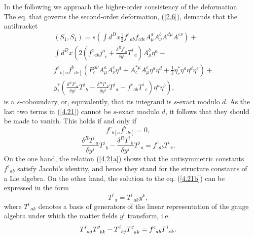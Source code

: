 \documentclass[a4paper,12pt]{article}
\begin{document}
In the following we approach the
higher-order consistency of the
deformation. The eq. that governs the
second-order deformation, (\ref{2.6}),
demands that the antibracket
\begin{eqnarray}
&&\left( S_{1},S_{1}\right) =
s\left( \int d^{D}x\frac{1}{2}f_{\;%
\;ab}^{c}f_{cde}A_{\mu }^{a}
A_{\nu }^{b}A^{d\mu }A^{e\nu }\right) +
\nonumber \\
&&\int d^{D}x\left( 2\left(
f_{\;\;ab}^{c}j_{\;\;c}^{\mu }+\frac{\delta
^{R}j_{\;\;b}^{\mu }}{\delta y^{i}}
T_{\;\;a}^{i}\right) A_{\mu }^{b}\eta
^{a}-\right. \nonumber \\
& &f_{\;\;b\left[ a\right. }^{c}
f_{\;\;\left. de\right] }^{b}\left( F_{c}^{\mu
\nu }A_{\mu }^{a}A_{\nu }^{e}
\eta ^{d}+A_{c}^{*\mu }A_{\mu }^{e}\eta
^{a}\eta ^{d}+\frac{1}{3}
\eta _{c}^{*}\eta ^{a}\eta ^{d}\eta ^{e}\right) +
\nonumber \\
&&\left. y_{i}^{*}\left( \frac{\delta ^{R}
T_{\;\;a}^{i}}{\delta y^{j}}%
T_{\;\;b}^{j}-\frac{\delta ^{R}
T_{\;\;b}^{i}}{\delta y^{j}}%
T_{\;\;a}^{j}-f_{\;\;ab}^{c}T_{\;\;c}^{i}\right) 
\eta ^{a}\eta ^{b}\right) ,
\label{4.21}
\end{eqnarray}
is a $s$-coboundary, or, equivalently,
that its integrand is $s$-exact
modulo $d$. As the last two terms in
(\ref{4.21}) cannot be $s$-exact modulo
$d$, it follows that they should be made
to vanish. This holds if and only
if
\begin{equation}
f_{\;\;b\left[ a\right. }^{c}
f_{\;\;\left. de\right] }^{b}=0,  \label{4.21a}
\end{equation}
\begin{equation}
\frac{\delta ^{R}T_{\;\;a}^{i}}{\delta y^{j}}
T_{\;\;b}^{j}-\frac{\delta
^{R}T_{\;\;b}^{i}}{\delta y^{j}}T_{\;\;a}^{j}=
f_{\;\;ab}^{c}T_{\;\;c}^{i}.
\label{4.21b}
\end{equation}
On the one hand, the relation (\ref{4.21a})
shows that the antisymmetric
constants $f_{\;\;ab}^{c}$ satisfy Jacobi's
identity, and hence they stand
for the structure constants of a Lie algebra.
On the other hand, the
solution to the eq. (\ref{4.21b}) can
be expressed in the form
\begin{equation}
T_{\;\;a}^{i}=T_{\;\;ak}^{i}y^{k},  \label{4.21c}
\end{equation}
where $T_{\;\;ak}^{i}$ denotes a basis
of generators of the linear
representation of the gauge algebra
under which the matter fields $y^{i}$
transform, i.e.
\begin{equation}
T_{\;\;aj}^{i}T_{\;\;bk}^{j}-T_{\;\;bj}^{i}
T_{\;\;ak}^{j}=f_{\;\;ab}^{c}T_{%
\;\;ck}^{i}.  \label{4.21d}
\end{equation}
\end{document}
